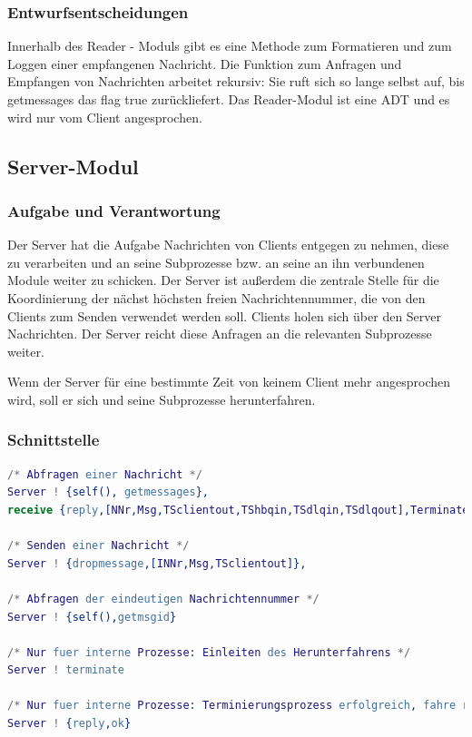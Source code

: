 \documentclass{article}
\begin{document}
\subsubsection{Entwurfsentscheidungen}
Innerhalb des Reader - Moduls gibt es eine Methode zum Formatieren und zum Loggen einer 
empfangenen Nachricht. 
Die Funktion zum Anfragen und Empfangen von Nachrichten arbeitet rekursiv: Sie ruft sich so
lange selbst auf, bis getmessages das flag true zurückliefert. Das Reader-Modul ist eine ADT
und es wird nur vom Client angesprochen.

\subsection{Server-Modul}
\subsubsection{Aufgabe und Verantwortung}
Der Server hat die Aufgabe Nachrichten von Clients entgegen zu nehmen, diese zu verarbeiten und an seine Subprozesse
bzw. an seine an ihn verbundenen Module weiter zu schicken. Der Server ist außerdem die zentrale Stelle für die
Koordinierung der nächst höchsten freien Nachrichtennummer, die von den Clients zum Senden verwendet werden soll.
Clients holen sich über den Server Nachrichten. Der Server reicht diese Anfragen an die relevanten Subprozesse weiter.

Wenn der Server für eine bestimmte Zeit von keinem Client mehr angesprochen wird, soll er sich und seine Subprozesse
herunterfahren.


\subsubsection{Schnittstelle}
\begin{lstlisting}[language=erlang]
/* Abfragen einer Nachricht */
Server ! {self(), getmessages},
receive {reply,[NNr,Msg,TSclientout,TShbqin,TSdlqin,TSdlqout],Terminated}

/* Senden einer Nachricht */
Server ! {dropmessage,[INNr,Msg,TSclientout]},

/* Abfragen der eindeutigen Nachrichtennummer */
Server ! {self(),getmsgid}

/* Nur fuer interne Prozesse: Einleiten des Herunterfahrens */
Server ! terminate

/* Nur fuer interne Prozesse: Terminierungsprozess erfolgreich, fahre runter*/
Server ! {reply,ok}
\end{lstlisting}
\end{document}
